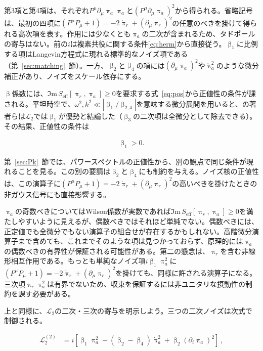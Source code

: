 \documentclass[a4paper,11pt]{ltjsarticle}
\numberwithin{equation}{section}
\newcommand{\Ima}{\Im \mathrm{m}\,}
\newcommand{\Eq}[1]{Eq.~(\ref{#1})}
\newcommand{\Sec}[1]{Sec.~\ref{#1}}
\renewcommand{\Eq}[1]{式~\eqref{#1}}
\renewcommand{\Sec}[1]{第~\ref{#1}~節}
\begin{document}
第3項と第4項は、それぞれ$P^\mu\partial_\mu\uppi_a\uppi_a$と$(P^\mu\partial_\mu\uppi_a)^2$から得られる。省略記号は、最初の四項に$(P^\mu P_\mu+1)=-2\dot{\uppi}_r+(\partial_\mu\uppi_r)^2$の任意のべきを掛けて得られる高次項を表す。作用には少なくとも$\uppi_a$の二次が含まれるため、タドポールの寄与はない。前の$i$は複素共役に関する条件\eqref{eq:herm}から直接従う。$\upbeta_1$に比例する項はLangevin方程式に現れる標準的なノイズ項である（\Sec{sec:matching}）。一方、$\upbeta_2$と$\upbeta_4$の項には$(\partial_\mu\uppi_a)^2$や$\dot{\uppi}_a^2$のような微分補正があり、ノイズをスケール依存にする。

$\upbeta$係数には、$\Ima S_{\mathrm{eff}}[\uppi_r,\uppi_a]\geq0$を要求する\Eq{eq:pos}から正値性の条件が課される。平坦時空で、$\omega^2,k^2\ll|\upbeta_1/\upbeta_{2,4}|$を意味する微分展開を用いると、\cite{Hongo:2018ant}の著者らは$\mathcal{L}_2$では$\upbeta_1$が優勢と結論した（$\upbeta_3$の二次項は全微分として除去できる）。その結果、正値性の条件は

\begin{align}
    \upbeta_1 > 0.
\end{align}

\Sec{sec:Pk}では、パワースペクトルの正値性から、別の観点で同じ条件が現れることを見る。この別の要請は$\upbeta_2$と$\upbeta_4$にも制約を与える。ノイズ核の正値性は、この演算子に$(P^\mu P_\mu+1)=-2\dot{\uppi}_r+(\partial_\mu\uppi_r)^2$の高いべきを掛けたときの非ガウス信号にも直接影響する。

$\uppi_a$の奇数べきについてはWilson係数が実数であれば$\Ima S_{\mathrm{eff}}[\uppi_r,\uppi_a]\geq0$を満たしやすいように見えるが、偶数べきではそれほど単純でない。偶数べきには、正定値でも全微分でもない演算子の組合せが存在するかもしれない。高階微分演算子まで含めても、これまでそのような項は見つかっておらず、原理的には$\uppi_a$の偶数べきの有界性が保証される可能性がある。第二の懸念は、$\uppi_r$を含む非線形相互作用である。もっとも単純なノイズ項$i\upbeta_1\uppi_a^2$に$(P^\mu P_\mu+1)=-2\dot{\uppi}_r+(\partial_\mu\uppi_r)^2$を掛けても、同様に許される演算子になる。三次項$\dot{\uppi}_r\uppi_a^2$は有界でないため、収束を保証するには非ユニタリな摂動性の制約を課す必要がある。

上と同様に、$\mathcal{L}_2$の二次・三次の寄与を明示しよう。三つの二次ノイズは次式で制御される。

\begin{align}
\mathcal{L}_2^{(2)} &= i \left[\upbeta_1 \uppi_a^2 - \left(\upbeta_2 - \upbeta_4\right)\dot{\uppi}_a^2 + \upbeta_2 \left(\partial_i \uppi_{a} \right)^2\right]\,,\label{eq:piq2free}
\end{align}
\end{document}
